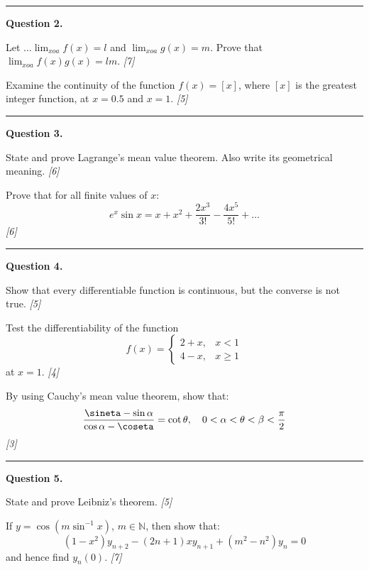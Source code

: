 \documentclass[11pt,a4paper]{article}
\newcommand{\pts}[1]{\hfill   \textit{[#1]}}
\begin{document}
\medskip\rule{\linewidth}{0.2pt}

\medskip


\noindent   \textbf{Question 2.}

\begin{parts}
  \item Let $\dots \lim_{x o a} f(x) = l$ and $\lim_{x o a} g(x) = m$. Prove that $\lim_{x o a} f(x)g(x) = lm$. \pts{7}
  \item Examine the continuity of the function $f(x) = [x]$, where $[x]$ is the greatest integer function, at $x = 0.5$ and $x = 1$. \pts{5}
\end{parts}

\medskip\rule{\linewidth}{0.2pt}

\medskip


\noindent   \textbf{Question 3.}

\begin{parts}
  \item State and prove Lagrange's mean value theorem. Also write its geometrical meaning. \pts{6}
  \item Prove that for all finite values of $x$:
  \[
  e^x \sin x = x + x^2 + \frac{2x^3}{3!} - \frac{4x^5}{5!} + \dots
  \] \pts{6}
\end{parts}

\medskip\rule{\linewidth}{0.2pt}

\medskip


\noindent   \textbf{Question 4.}

\begin{parts}
  \item Show that every differentiable function is continuous, but the converse is not true. \pts{5}
  \item Test the differentiability of the function
  \[
  f(x) = 
\begin{cases} 2+x, & x < 1 \\ 4-x, & x \ge 1 \end{cases}
  \]
  at $x = 1$. \pts{4}
  \item By using Cauchy's mean value theorem, show that:
  \[
  \frac{\sineta - \sin\alpha}{\cos\alpha - \coseta} = \cot \theta, \quad 0 < \alpha <  \theta < \beta < \frac{\pi}{2}
  \] \pts{3}
\end{parts}

\medskip\rule{\linewidth}{0.2pt}

\medskip


\noindent   \textbf{Question 5.}

\begin{parts}
  \item State and prove Leibniz's theorem. \pts{5}
  \item If $y = \cos(m \sin^{-1} x)$, $m \in \mathbb{N}$, then show that:
  \[
  (1-x^2) y_{n+2} - (2n+1) x y_{n+1} + (m^2 - n^2) y_n = 0
  \]
  and hence find $y_n(0)$. \pts{7}
\end{parts}
\end{document}
